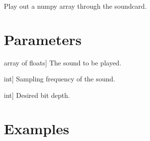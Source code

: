 \documentclass[letterpaper,10pt,english]{sphinxmanual}
\begin{document}
\begin{fulllineitems}
\label{\detokenize{intro:wavpy.sound}}
\pysigstartsignatures
{}
\pysigstopsignatures
\sphinxAtStartPar
Play out a numpy array through the soundcard.


\section{Parameters}
\label{\detokenize{intro:parameters}}\begin{description}
\sphinxlineitem{snd}{[}array of floats{]}
\sphinxAtStartPar
The sound to be played.

\sphinxlineitem{fs}{[}int{]}
\sphinxAtStartPar
Sampling frequency of the sound.

\sphinxlineitem{nbits}{[}int{]}
\sphinxAtStartPar
Desired bit depth.

\end{description}


\section{Examples}
\label{\detokenize{intro:examples}}
\begin{sphinxVerbatim}[commandchars=\\\{\}]
  
\end{sphinxVerbatim}

\end{fulllineitems}

\end{document}
